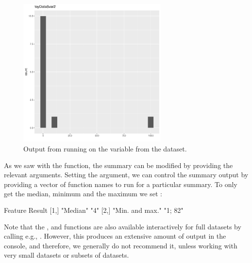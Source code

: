 \documentclass[article,shortnames]{jss}
\newcommand{\hl}[1]{\textcolor{magenta}{#1}}
\begin{document}
\begin{figure}[tb]
\begin{center}
\includegraphics[width=7.5cm]{toyData-var2.pdf}
\end{center}
\caption{Output from running  on the variable  from the
 dataset.}
\label{fig:example2}
\end{figure}


As we saw with the  function, the summary can be modified
by providing the relevant  arguments. Setting the
 argument, we can control the summary output by
providing a vector of function names to run for a particular summary. To
only get the median, minimum and the maximum we set
:

\begin{Schunk}
\begin{Soutput}
     Feature         Result 
[1,] "Median"        "4"    
[2,] "Min. and max." "1; 82"
\end{Soutput}
\end{Schunk}

Note that the ,  and  functions are also available interactively for full datasets by calling e.g., . However, this produces an extensive amount of output in the console, and therefore, we generally do not recommend it, unless working with very small datasets or subsets of datasets.

\end{document}
